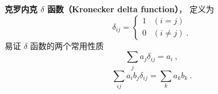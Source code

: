 
\begin{issues}
\end{issues}


\textbf{克罗内克 $\delta$ 函数（Kronecker delta function）}， 定义为
\begin{equation}\label{eq_Kronec_2}
\delta_{ij} =
\begin{cases}
1 & (i = j)\\
0 & (i \ne j)~.
\end{cases}
\end{equation}
易证 $\delta$ 函数的两个常用性质
\begin{equation}\label{eq_Kronec_1}
\sum_j a_j \delta_{ij} = a_i~,
\end{equation}
\begin{equation}
\sum_{ij} a_i b_j \delta_{ij} = \sum_k a_k b_k~.
\end{equation}
